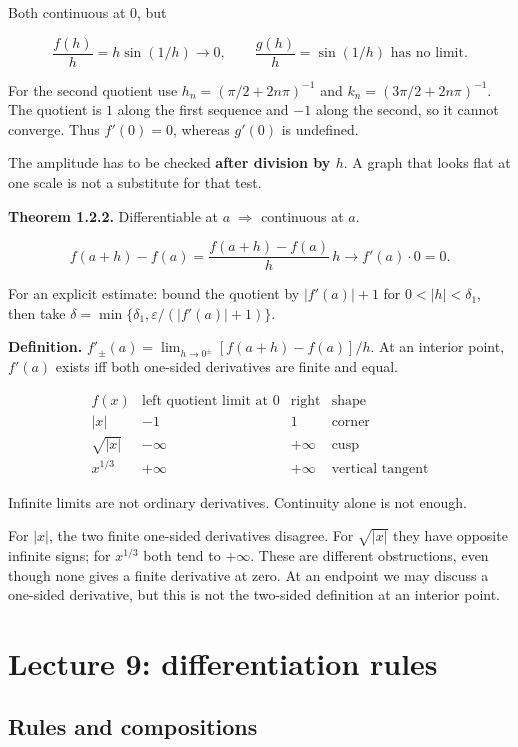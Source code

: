 \documentclass[11pt,a4paper]{article}
\begin{document}
Both continuous at \(0\), but

\[
\frac{f(h)}h=h\sin(1/h)\to0,\qquad
\frac{g(h)}h=\sin(1/h)\text{ has no limit}.
\]

For the second quotient use \(h_n=(\pi/2+2n\pi)^{-1}\) and
\(k_n=(3\pi/2+2n\pi)^{-1}\). The quotient is \(1\) along the first
sequence and \(-1\) along the second, so it cannot converge. Thus
\(f'(0)=0\), whereas \(g'(0)\) is undefined.

The amplitude has to be checked \textbf{after division by \(h\)}. A
graph that looks flat at one scale is not a substitute for that test.

\textbf{Theorem 1.2.2.} Differentiable at \(a\) \(\Rightarrow\)
continuous at \(a\).

\[
f(a+h)-f(a)=\frac{f(a+h)-f(a)}h\,h\to f'(a)\cdot0=0.
\]

For an explicit estimate: bound the quotient by \(|f'(a)|+1\) for
\(0<|h|<\delta_1\), then take
\(\delta=\min\{\delta_1,\varepsilon/(|f'(a)|+1)\}\).

\textbf{Definition.} \(f'_\pm(a)=\lim_{h\to0^\pm}[f(a+h)-f(a)]/h\). At
an interior point, \(f'(a)\) exists iff both one-sided derivatives are
finite and equal.

\[
\begin{array}{c|c|c|c}
f(x)&\text{left quotient limit at }0&\text{right}&\text{shape}\\\hline
|x|&-1&1&\text{corner}\\
\sqrt{|x|}&-\infty&+\infty&\text{cusp}\\
x^{1/3}&+\infty&+\infty&\text{vertical tangent}
\end{array}
\]

Infinite limits are not ordinary derivatives. Continuity alone is not
enough.

For \(|x|\), the two finite one-sided derivatives disagree. For
\(\sqrt{|x|}\) they have opposite infinite signs; for \(x^{1/3}\) both
tend to \(+\infty\). These are different obstructions, even though none
gives a finite derivative at zero. At an endpoint we may discuss a
one-sided derivative, but this is not the two-sided definition at an
interior point.

\section{Lecture 9: differentiation
rules}\label{lecture-9-differentiation-rules}

\subsection{Rules and compositions}\label{rules-and-compositions}
\end{document}
